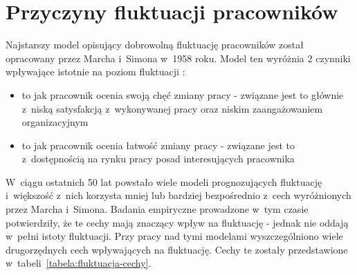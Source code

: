 \clearpage


\section{Przyczyny fluktuacji pracowników}\label{sec:czynniki-wplywajace-na-fluktuacje}

Najstarszy model opisujący dobrowolną fluktuację pracowników został opracowany przez Marcha i~Simona w~1958 roku.
Model ten wyróżnia 2 czynniki wpływające istotnie na poziom fluktuacji \cite{wozniak-2012}:
\begin{itemize}
    \item to jak pracownik ocenia swoją chęć zmiany pracy - związane jest to głównie z~niską satysfakcją z~wykonywanej pracy oraz niskim zaangażowaniem organizacyjnym
    \item to jak pracownik ocenia łatwość zmiany pracy - związane jest to z~dostępnością na rynku pracy posad interesujących pracownika
\end{itemize}

W~ciągu ostatnich 50 lat powstało wiele modeli prognozujących fluktuację i~większość z~nich korzysta mniej lub bardziej bezpośrednio z~cech wyróżnionych przez Marcha i~Simona.
Badania empiryczne prowadzone w~tym czasie potwierdziły, że te cechy mają znaczący wpływ na fluktuację - jednak nie oddają w~pełni istoty fluktuacji.
Przy pracy nad tymi modelami wyszczególniono wiele drugorzędnych cech wpływających na fluktuację.
Cechy te zostały przedstawione w~tabeli~\ref{tabela:fluktuacja-cechy}.

